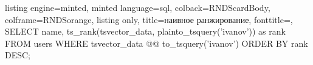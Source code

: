 \begin{frame}[fragile, t]
    \begin{tcblisting}{
      listing engine=minted,
      minted language=sql,
      colback=RNDScardBody,
      colframe=RNDSorange,
      listing only,
      title=наивное ранжирование,
      fonttitle=\normalsize,
    }
SELECT 
  name, ts_rank(tsvector_data, plainto_tsquery('ivanov')) as rank
FROM 
  users
WHERE 
  tsvector_data @@ to_tsquery('ivanov')
ORDER BY 
  rank DESC;
  \end{tcblisting}
\end{frame}
